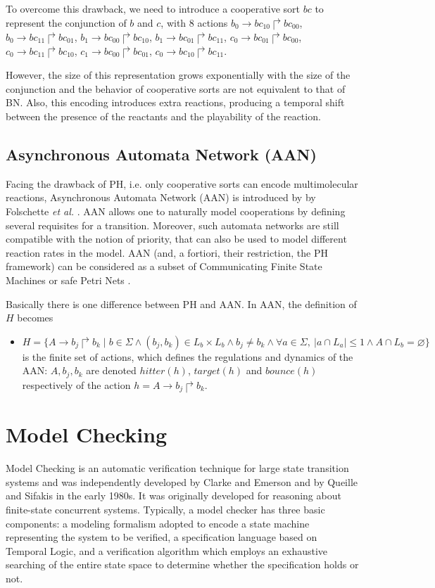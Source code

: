 To overcome this drawback, we need to introduce a cooperative sort $bc$ to represent the conjunction of $b$ and $c$, with 8 actions $b_0\to bc_{10}\Rsh bc_{00}$, $b_0\to bc_{11}\Rsh bc_{01}$, $b_1\to bc_{00}\Rsh bc_{10}$, $b_1\to bc_{01}\Rsh bc_{11}$, $c_0\to bc_{01}\Rsh bc_{00}$, $c_0\to bc_{11}\Rsh bc_{10}$, $c_1\to bc_{00}\Rsh bc_{01}$, $c_0\to bc_{10}\Rsh bc_{11}$.

However, the size of this representation grows exponentially with the size of the conjunction and the behavior of cooperative sorts are not equivalent to that of BN. 
Also, this encoding introduces extra reactions, producing a temporal shift between the presence of the reactants and the playability of the reaction.

\subsection{Asynchronous Automata Network (AAN)}
Facing the drawback of PH, i.e. only cooperative sorts can encode multimolecular reactions, Asynchronous Automata Network (AAN) is introduced by by Folschette \textit{et al.} \cite{folschette2015}.
AAN allows one to naturally model cooperations by defining several requisites for a transition.
Moreover, such automata networks are still compatible with the notion of priority, that can also be used to model different reaction rates in the model.
AAN (and, a fortiori, their restriction, the PH framework) can be considered as a subset of Communicating Finite State Machines or safe Petri Nets \cite{pauleve2012process}.

Basically there is one difference between PH and AAN. 
In AAN, the definition of $H$ becomes

\begin{itemize}
    \item $H=\{A\to b_j\Rsh b_k\mid b\in \Sigma \land (b_j,b_k)\in L_b\times L_b\land b_j\neq b_k\land \forall a \in \Sigma,\ |a\cap L_a|\leq 1 \land A\cap L_b=\varnothing\}$ is the finite set of actions, which defines the regulations and dynamics of the AAN: $A, b_j, b_k$ are denoted $hitter(h)$, $target(h)$ and $bounce(h)$ respectively of the action $h=A\to b_j\Rsh b_k$.
\end{itemize}



\section{Model Checking}
Model Checking is an automatic verification technique for large state transition systems and was independently developed by Clarke and Emerson \cite{clarke1981design} and by Queille and Sifakis \cite{queille1982specification} in the early 1980s. It was originally developed for reasoning about finite-state concurrent systems.
Typically, a model checker has three basic components: a modeling formalism adopted to encode a state machine representing the system to be verified, a specification language based on Temporal Logic, and a verification algorithm \cite{clarke20142} which employs an exhaustive searching of the entire state space to determine whether the specification holds or not.


